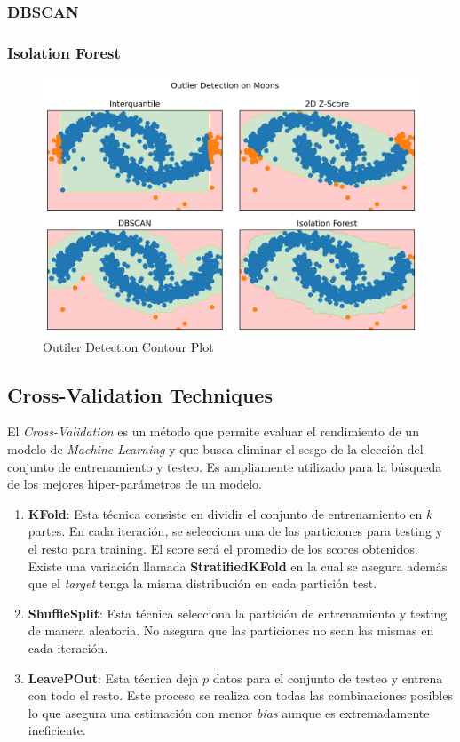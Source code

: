 \subsubsection{DBSCAN}

\subsubsection{Isolation Forest}

\begin{figure}[H]
    \center
    \includegraphics[scale=0.55]{notebooks/Others/img/outlier_detection.png}
    \caption{Outiler Detection Contour Plot}
\end{figure}


\subsection{Cross-Validation Techniques}

El \textit{Cross-Validation} es un método que permite evaluar el rendimiento de un modelo de \textit{Machine Learning} y que busca eliminar el sesgo de la elección del conjunto de entrenamiento y testeo. Es ampliamente utilizado para la búsqueda de los mejores hiper-parámetros de un modelo. 


\begin{enumerate}
    \item \textbf{KFold}: Esta técnica consiste en dividir el conjunto de entrenamiento en $k$ partes. En cada iteración, se selecciona una de las particiones para testing y el resto para training. El score será el promedio de los scores obtenidos. Existe una variación llamada \textbf{StratifiedKFold} en la cual se asegura además que el \textit{target} tenga la misma distribución en cada partición test. 
    \item \textbf{ShuffleSplit}: Esta técnica selecciona la partición de entrenamiento y testing de manera aleatoria. No asegura que las particiones no sean las mismas en cada iteración. 
    \item \textbf{LeavePOut}: Esta técnica deja $p$ datos para el conjunto de testeo y entrena con todo el resto. Este proceso se realiza con todas las combinaciones posibles lo que asegura una estimación con menor \textit{bias} aunque es extremadamente ineficiente. 
\end{enumerate}

